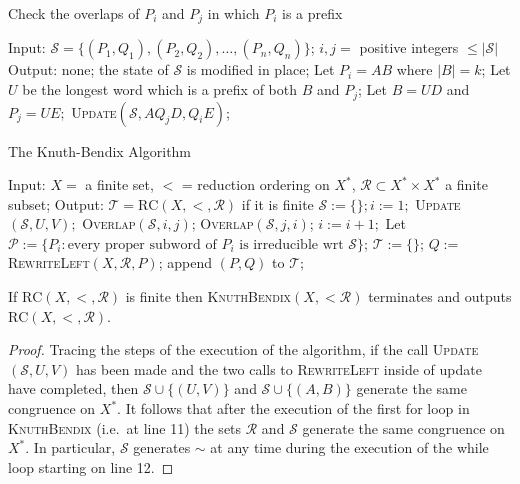 \begin{ap}
\newpage{}

\begin{algorithm}
\caption{Check the overlaps of $P_i$ and $P_j$ in which $P_i$ is a prefix}
\begin{algorithmic}[1]
    \State Input: $\mathcal{S} = \{(P_1,Q_1), (P_2,Q_2), \dots,(P_n,Q_n)\}$; $i,j = $ positive integers $\le |\mathcal{S}|$
    \State Output: none; the state of $\mathcal{S}$ is modified in place;
    \State Let $P_i = AB$ where $|B| = k$;
    \State Let $U$ be the longest word which is a prefix of both $B$ and $P_j$;
    \State Let $B = UD$ and $P_j = UE;$
    \State \textsc{Update}$(\mathcal{S}, AQ_jD, Q_iE)$;
    \EndIf
    \EndFor
    \EndProcedure
\end{algorithmic}
\end{algorithm}

\begin{algorithm}
\caption{The Knuth-Bendix Algorithm}
\begin{algorithmic}[1]
    \State Input:
    \State $X=$ a finite set, $<$ = reduction ordering on $X^*$, $\mathcal{R} \subset X^*\times X^*$ a finite subset;
    \State Output: $\mathcal{T} = \mathrm{RC}(X, <, \mathcal{R})$ if it is finite
    \State
    \State $\mathcal{S} := \{\};i:=1;$
    \State \textsc{Update}$(\mathcal{S},U,V);$
    \EndFor
    \State \textsc{Overlap}$(\mathcal{S}, i,j)$;
    \State \textsc{Overlap}$(\mathcal{S}, j,i)$;
    \EndIf
    \EndFor
    \State $i := i+1;$
    \EndWhile
    \State Let $\mathcal{P} := \{P_i : \text{every proper subword of } P_i \text{ is irreducible wrt } \mathcal{S}\}$;
    \State $\mathcal{T} := \{\}$;
    \State $Q :=$ \textsc{RewriteLeft}$(X, \mathcal{R}, P)$;
    \State append $(P,Q)$ to $\mathcal{T}$;
    \EndFor
    \EndProcedure
\end{algorithmic}
\end{algorithm}

\newpage{}

\begin{thm} If $\mathrm{RC}(X,<,\mathcal{R})$ is finite then
    \textsc{KnuthBendix}$(X, < \mathcal{R})$ terminates and outputs
    $\mathrm{RC}(X,<,\mathcal{R})$.
\end{thm}
\begin{proof} Tracing the steps of the execution of the algorithm, if the call
    \textsc{Update}$(\mathcal{S},U,V)$ has been made and the two calls to
    \textsc{RewriteLeft} inside of update have completed, then $\mathcal{S}
    \cup \{(U,V)\}$ and $\mathcal{S} \cup \{(A,B)\}$ generate the same
    congruence on $X^*$. It follows that after the execution of the first for
    loop in \textsc{KnuthBendix} (i.e.~at line 11) the sets $\mathcal{R}$ and
    $\mathcal{S}$ generate the same congruence on $X^*$. In particular,
    $\mathcal{S}$ generates $\sim$ at any time during the execution of the
    while loop starting on line 12.


\end{proof}
\end{ap}

